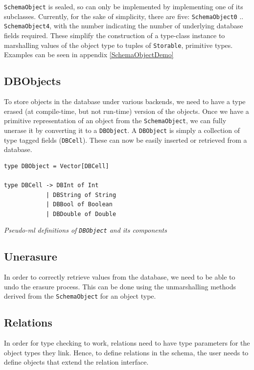 \documentclass[12pt,a4paper,twoside,openright]{report}
\newcommand\codeName[1]{\texttt{#1}}
\newcommand\note[1]{\textit{#1}}
\renewcommand{\baselinestretch}{1.1}    %
\begin{document}
	\codeName{SchemaObject} is sealed, so can only be implemented by implementing one of its subclasses. Currently, for the sake of simplicity, there are five: \codeName{SchemaObject0} .. \codeName{SchemaObject4}, with the number indicating the number of underlying database fields required. These simplify the construction of a type-class instance to marshalling values of the object type to tuples of  \codeName{Storable}, primitive types. Examples can be seen in appendix \ref{SchemaObjectDemo}
	
	\subsection{DBObjects}
	
	To store objects in the database under various backends, we need to have a type erased (at compile-time, but not run-time) version of the objects. Once we have a primitive representation of an object from the \codeName{SchemaObject}, we can fully unerase it by converting it to a \codeName{DBObject}. A \codeName{DBObject} is simply a collection of type tagged fields (\codeName{DBCell}). These can now be easily inserted or retrieved from a database.
	
\renewcommand{\baselinestretch}{0.8}
\begin{framed}
	\begin{verbatim}
type DBObject = Vector[DBCell]

type DBCell -> DBInt of Int 
			| DBString of String
			| DBBool of Boolean
			| DBDouble of Double
	\end{verbatim}
	
	\note{Pseudo-ml definitions of \codeName{DBObject} and its components}
\end{framed}
\renewcommand{\baselinestretch}{0.8}
	
	\subsection{Unerasure}
	In order to correctly retrieve values from the database, we need to be able to undo the erasure process. This can be done using the unmarshalling methods derived from the \codeName{SchemaObject}  for an object type.
	\subsection{Relations}
	    In order for type checking to work, relations need to have type parameters for the object types they link. Hence, to define relations in the schema, the user needs to define objects that extend the relation interface.
	    
\end{document}
